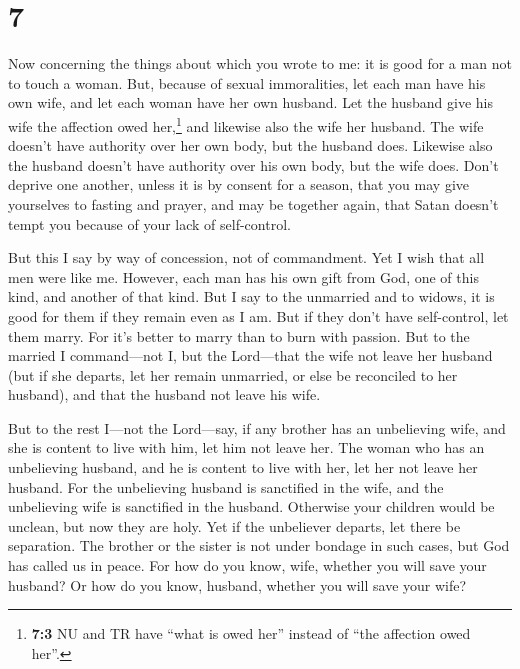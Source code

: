 \hypertarget{section-6}{%
\section{7}\label{section-6}}

 Now concerning the things about which you wrote to me: it
is good for a man not to touch a woman.  But, because of
sexual immoralities, let each man have his own wife, and let each woman
have her own husband.  Let the husband give his wife the
affection owed her,\footnote{\textbf{7:3} NU and TR have ``what is owed
  her'' instead of ``the affection owed her''.} and likewise also the
wife her husband.  The wife doesn't have authority over
her own body, but the husband does. Likewise also the husband doesn't
have authority over his own body, but the wife does. 
Don't deprive one another, unless it is by consent for a season, that
you may give yourselves to fasting and prayer, and may be together
again, that Satan doesn't tempt you because of your lack of
self-control.

 But this I say by way of concession, not of commandment.
 Yet I wish that all men were like me. However, each man
has his own gift from God, one of this kind, and another of that kind.
 But I say to the unmarried and to widows, it is good for
them if they remain even as I am.  But if they don't have
self-control, let them marry. For it's better to marry than to burn with
passion.  But to the married I command---not I, but the
Lord---that the wife not leave her husband  (but if she
departs, let her remain unmarried, or else be reconciled to her
husband), and that the husband not leave his wife.

 But to the rest I---not the Lord---say, if any brother
has an unbelieving wife, and she is content to live with him, let him
not leave her.  The woman who has an unbelieving husband,
and he is content to live with her, let her not leave her husband.
 For the unbelieving husband is sanctified in the wife,
and the unbelieving wife is sanctified in the husband. Otherwise your
children would be unclean, but now they are holy.  Yet if
the unbeliever departs, let there be separation. The brother or the
sister is not under bondage in such cases, but God has called us in
peace.  For how do you know, wife, whether you will save
your husband? Or how do you know, husband, whether you will save your
wife?

